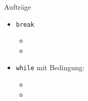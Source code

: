 \begin{frame}[fragile]{Aufträge}
    \begin{itemize}
        \item \lstinline|break|
        \begin{itemize}
             \item {}
            \item {}
        \end{itemize}
        \item \lstinline|while| mit Bedingung:
        \begin{itemize}
             \item {}
             \item {}
        \end{itemize}
    \end{itemize}
\end{frame}
